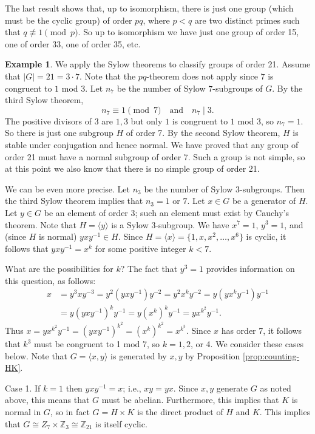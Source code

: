 \documentclass[11pt,oneside]{article}
\theoremstyle{definition}
\newtheorem{example}[thm]{Example}
\newcommand{\Z}{\mathbb{Z}} %
\newcommand{\gen}[1]{\langle #1 \rangle}
\begin{document}
The last result shows that, up to isomorphism, there is just one group
(which must be the cyclic group) of order $pq$, where $p<q$ are two
distinct primes such that $q \not\equiv 1 \pmod{p}$. So up to
isomorphism we have just one group of order 15, one of order 33, one
of order 35, etc.

\begin{example}
We apply the Sylow theorems to classify groups of order 21. Assume
that $|G|=21 = 3 \cdot 7$. Note that the $pq$-theorem does not apply
since $7$ is congruent to $1$ mod $3$. Let $n_7$ be the number of
Sylow $7$-subgroups of $G$. By the third Sylow theorem,
\[
   n_7 \equiv 1 \pmod{7} \quad\text{and}\quad n_7 \mid 3.
\]
The positive divisors of $3$ are $1, 3$ but only $1$ is congruent to
$1$ mod $3$, so $n_7 = 1$. So there is just one subgroup $H$ of order
7. By the second Sylow theorem, $H$ is stable under conjugation and
hence normal. We have proved that any group of order 21 must have a
normal subgroup of order 7. Such a group is not simple, so at this
point we also know that there is no simple group of order 21.

We can be even more precise. Let $n_3$ be the number of Sylow
$3$-subgroups. Then the third Sylow theorem implies that $n_3 = 1$ or
$7$. Let $x \in G$ be a generator of $H$. Let $y \in G$ be an element
of order 3; such an element must exist by Cauchy's theorem. Note that
$H = \gen{y}$ is a Sylow 3-subgroup. We have $x^7 = 1$, $y^3 = 1$, and
(since $H$ is normal) $yxy^{-1} \in H$. Since $H = \gen{x} = \{1, x,
x^2, \dots, x^6\}$ is cyclic, it follows that $yxy^{-1} = x^k$ for
some positive integer $k<7$.

What are the possibilities for $k$? The fact that $y^3=1$ provides
information on this question, as follows:
\begin{align*}
  x &= y^3xy^{-3} = y^2 (yxy^{-1}) y^{-2} = y^2 x^k y^{-2} = y (y x^k
  y^{-1}) y^{-1} \\ &= y (y x y^{-1})^k y^{-1} = y (x^k)^k y^{-1} = y
  x^{k^2} y^{-1}.
\end{align*}
Thus $x = y x^{k^2} y^{-1} = (yxy^{-1})^{k^2} = (x^k)^{k^2} =
x^{k^3}$. Since $x$ has order 7, it follows that $k^3$ must be
congruent to 1 mod 7, so $k = 1, 2$, or 4. We consider these cases
below. Note that $G = \gen{x,y}$ is generated by $x, y$ by Proposition
\ref{prop:counting-HK}.

Case 1. If $k=1$ then $yxy^{-1} = x$; i.e., $xy=yx$. Since $x,y$ generate
$G$ as noted above, this means that $G$ must be abelian. Furthermore,
this implies that $K$ is normal in $G$, so in fact $G = H \times K$ is
the direct product of $H$ and $K$. This implies that $G \cong Z_7
\times \Z_3 \cong \Z_{21}$ is itself cyclic.


\end{example}
\end{document}
